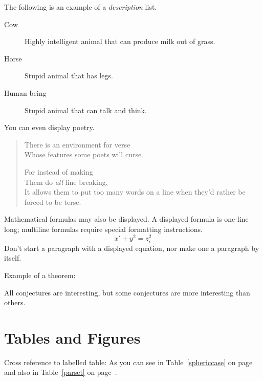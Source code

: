 \documentclass{kluwer}    %
\begin{document}
\begin{article}
The following is an example of a {\em description} list.
\begin{description}
\item[Cow] Highly intelligent animal that can produce milk out of grass.
\item[Horse] Stupid animal that has legs.
\item[Human being] Stupid animal that can talk and think.
\end{description}

You can even display poetry.
\begin{verse}
   There is an environment for verse \\    %
   Whose features some poets will curse.   %


   For instead of making\\
   Them do {\em all\/} line breaking, \\
   It allows them to put too many words on a line when they'd 
   rather be forced to be terse.
\end{verse}

Mathematical formulas may also be displayed.  A displayed formula is
one-line long; multiline formulas require special formatting
instructions.
   \[  x' + y^{2} = z_{i}^{2}\]
Don't start a paragraph with a displayed equation, nor make
one a paragraph by itself.

Example of a theorem:


\begin{guess}
All conjectures are interesting, but some conjectures are more
interesting than others.
\end{guess}


\section{Tables and Figures}
Cross reference to labelled table: As you can see in Table~\ref{sphericcase} on 
page~\pageref{sphericcase} and also in Table~\ref{parset} on page~\pageref{parset}.






\end{article}
\end{document}
